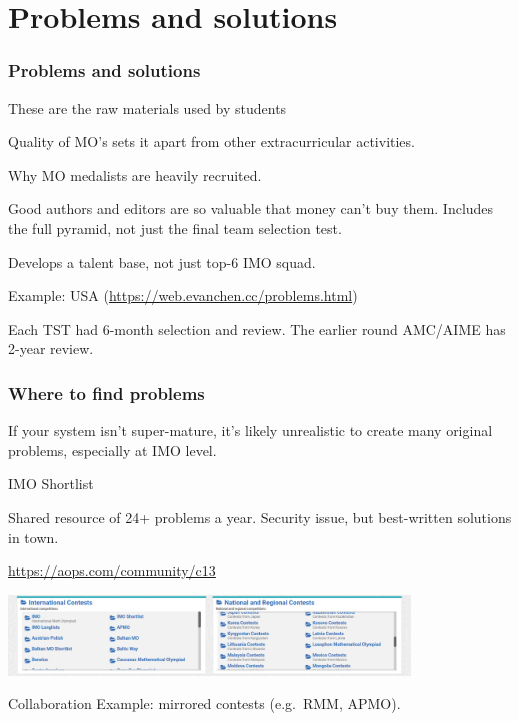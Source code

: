 \documentclass[10pt]{beamer}
\begin{document}
\section{Problems and solutions}
\begin{frame}
  \frametitle{Problems and solutions}
  \begin{block}{These are the raw materials used by students}
    \begin{itemize}
      \ii Quality of MO's sets it apart from other extracurricular activities.
      \begin{itemize}
        \ii Why MO medalists are heavily recruited.
      \end{itemize}
      \ii Good authors and editors are so valuable that money can't buy them.
      \ii Includes the full pyramid, not just the final team selection test.
      \begin{itemize}
        \ii Develops a talent base, not just top-6 IMO squad.
      \end{itemize}
    \end{itemize}
  \end{block}
  \pause
  \begin{exampleblock}{Example: USA {\footnotesize (\url{https://web.evanchen.cc/problems.html})}}
    \begin{itemize}
      \ii Each TST had \alert{6-month selection and review}.
      \ii The earlier round AMC/AIME has \alert{2-year review}.
    \end{itemize}
  \end{exampleblock}
\end{frame}
\begin{frame}
  \frametitle{Where to find problems}
  If your system isn't super-mature, it's likely
  unrealistic to create many original problems, especially at IMO level.
  \begin{alertblock}{IMO Shortlist}
    \begin{itemize}
      \ii Shared resource of 24+ problems a year.
      \ii Security issue, but best-written solutions in town.
    \end{itemize}
  \end{alertblock}
  \pause
  \begin{block}{\url{https://aops.com/community/c13}}
    \begin{center}
      \includegraphics[width=0.8\textwidth]{contest-index.png}
    \end{center}
  \end{block}
  \pause
  \begin{exampleblock}{Collaboration}
    Example: mirrored contests (e.g.\ RMM, APMO).
  \end{exampleblock}
\end{frame}
\end{document}
